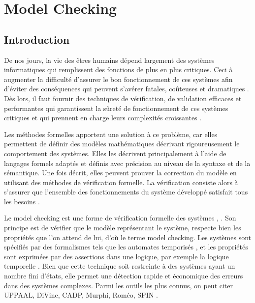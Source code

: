 \chapter{Model Checking}\label{chapmc}

\section{Introduction} 
De nos jours, la vie des êtres humains dépend largement des systèmes informatiques qui remplissent des fonctions de plus en plus critiques. Ceci à augmenter la difficulté d'assurer le bon fonctionnement de ces systèmes afin d'éviter des conséquences qui peuvent s'avérer fatales, coûteuses et dramatiques \citep{Huckle2015}. Dès lors, il faut fournir des techniques de vérification, de validation efficaces et performantes qui garantissent la sûreté de fonctionnement de ces systèmes critiques et qui prennent en charge leurs complexités croissantes \citep{Ferrari1978}.

Les méthodes formelles apportent une solution à ce problème, car elles permettent de définir des modèles mathématiques décrivant  rigoureusement le comportement des systèmes. Elles les décrivent principalement à l'aide de langages formels adaptés et définis avec précision au niveau de la syntaxe et de la sémantique. Une fois décrit, elles peuvent prouver la correction du modèle en utilisant des méthodes de vérification formelle. La vérification consiste alors à s'assurer que l'ensemble des fonctionnements du système développé satisfait tous les besoins \citep{ClarkeWing1996}.
 
Le model checking est une forme de vérification formelle des systèmes \citep{Cheng2006}, \citep{Wang2004}. Son principe est de vérifier que le modèle représentant le système, respecte bien les propriétés que l'on attend de lui, d'où le terme model checking. Les systèmes sont spécifiés par des formalismes tels que les automates temporisés \citep{AlurDill1994}, et les propriétés sont exprimées par des assertions dans une logique, par exemple la logique temporelle \citep{BenAri1983}. Bien que cette technique soit restreinte à des systèmes ayant un nombre fini d'états, elle permet une détection rapide et économique des erreurs dans des systèmes complexes. Parmi les outils les plus connus, on peut citer UPPAAL, DiVine, CADP, Murphi, Roméo, SPIN \citep{Behrmann2004,Barnat2010,Garavel2013,Dill1996,Lime2009}.

